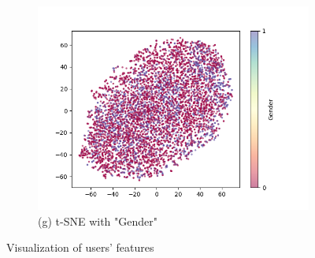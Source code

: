 \documentclass{article}
\begin{document}
\begin{figure}[H]
\begin{subfigure}{0.49\textwidth}
        \includegraphics[width=\textwidth]{fig/tsne_gender.png}
        \caption*{(g) t-SNE with "Gender"}
    \end{subfigure}
    \caption{Visualization of users' features}
\end{figure}

\newpage
\end{document}
